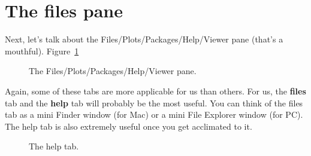 \documentclass[
  letterpaper,
  DIV=11,
  numbers=noendperiod]{scrreprt}
\begin{document}
\section{The files pane}\label{the-files-pane}

Next, let's talk about the Files/Plots/Packages/Help/Viewer pane (that's
a mouthful). Figure~\ref{fig-files-pane}

\begin{figure}


\caption{\label{fig-files-pane}The Files/Plots/Packages/Help/Viewer
pane.}

\end{figure}%

Again, some of these tabs are more applicable for us than others. For
us, the \textbf{files} tab and the \textbf{help} tab will probably be
the most useful. You can think of the files tab as a mini Finder window
(for Mac) or a mini File Explorer window (for PC). The help tab is also
extremely useful once you get acclimated to it.

\begin{figure}


\caption{\label{fig-help}The help tab.}

\end{figure}%
\end{document}
